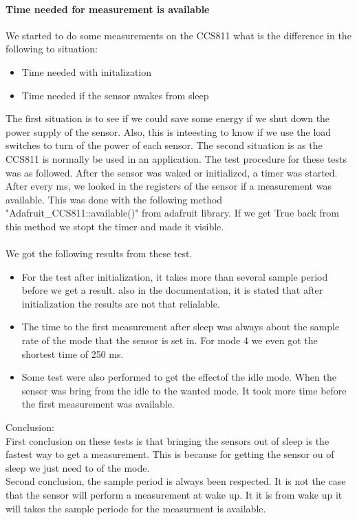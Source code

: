 \documentclass[11pt,a4paper]{article}
\begin{document}
\paragraph{Time needed for measurement is available}
We started to do some measurements on the CCS811 what is the difference in the following to situation:
\begin{itemize}
	\item Time needed with initalization
	\item Time needed if the sensor awakes from sleep
\end{itemize}
The first situation is to see if we could save some energy if we shut down the power supply of the sensor. Also, this is inteesting to know if we use the load switches to turn of the power of each sensor. The second situation is as the CCS811 is  normally be used in an application. The test procedure for these tests was as followed. After the sensor was waked or initialized, a timer was started. After every  ms, we looked in the registers of the sensor if a measurement was available. This was done with the following method "Adafruit\_CCS811::available()" from adafruit library. If we get True back from this method we stopt the timer and made it visible.
\\ \\
We got the following results from these test.
\begin{itemize}
\item For the test after initialization, it takes more than several sample period before we get a result. also in the documentation, it is stated that after initialization the results are not that relialable.
\item The time to the first measurement after sleep was always about the sample rate of the mode that the sensor is set in. For mode 4 we even got the shortest time of 250 ms. 
\item Some test were also performed to get the effectof the idle mode. When the sensor was bring from the idle to the wanted mode. It took more time before the first measurement was available.
\end{itemize}
Conclusion: \\ First conclusion on these tests is that bringing the sensors out of sleep is the fastest way to get a measurement. This is because for getting the sensor ou of sleep we just need to of the mode. 
\\ Second conclusion, the sample period is always been respected. It is not the case that the sensor will perform a measurement at wake up. It it is from wake up it will takes the sample periode for the measurment is available.
\end{document}
